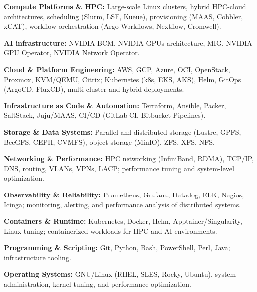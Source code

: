 \begin{cventries}
\cventry
{} %
{} %
{} %
{} %
{ %
	\begin{cvitems}    
    \item{\textbf{Compute Platforms \& HPC:} Large-scale Linux clusters, hybrid HPC-cloud architectures, scheduling (Slurm, LSF, Kueue), provisioning (MAAS, Cobbler, xCAT), workflow orchestration (Argo Workflows, Nextflow, Cromwell).}
    \item{\textbf{AI infrastructure:} NVIDIA BCM, NVIDIA GPUs architecture, MIG, NVIDIA GPU Operator, NVIDIA Network Operator.}
    \item{\textbf{Cloud \& Platform Engineering:} AWS, GCP, Azure, OCI, OpenStack, Proxmox, KVM/QEMU, Citrix; Kubernetes (k8s, EKS, AKS), Helm, GitOps (ArgoCD, FluxCD), multi-cluster and hybrid deployments.}
    \item{\textbf{Infrastructure as Code \& Automation:} Terraform, Ansible, Packer, SaltStack, Juju/MAAS, CI/CD (GitLab CI, Bitbucket Pipelines).}
    \item{\textbf{Storage \& Data Systems:} Parallel and distributed storage (Lustre, GPFS, BeeGFS, CEPH, CVMFS), object storage (MinIO), ZFS, XFS, NFS.}
    \item{\textbf{Networking \& Performance:} HPC networking (InfiniBand, RDMA), TCP/IP, DNS, routing, VLANs, VPNs, LACP; performance tuning and system-level optimization.}
    \item{\textbf{Observability \& Reliability:} Prometheus, Grafana, Datadog, ELK, Nagios, Icinga; monitoring, alerting, and performance analysis of distributed systems.}
    \item{\textbf{Containers \& Runtime:} Kubernetes, Docker, Helm, Apptainer/Singularity, Linux tuning; containerized workloads for HPC and AI environments.}
    \item{\textbf{Programming \& Scripting:} Git, Python, Bash, PowerShell, Perl, Java; infrastructure tooling.}
    \item{\textbf{Operating Systems:} GNU/Linux (RHEL, SLES, Rocky, Ubuntu), system administration, kernel tuning, and performance optimization.}
\end{cvitems}
}
\end{cventries}
